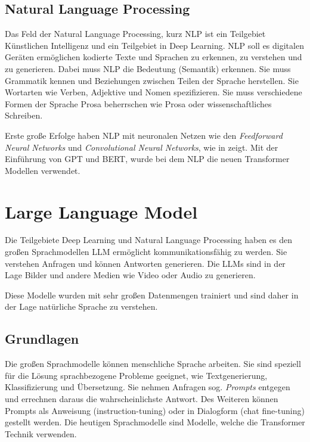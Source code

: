 \subsection{Natural Language Processing}
Das Feld der Natural Language Processing, kurz \acrshort{NLP} ist ein Teilgebiet Künstlichen Intelligenz und ein Teilgebiet in Deep Learning. NLP soll es digitalen Geräten ermöglichen kodierte Texte und Sprachen zu erkennen, zu verstehen und zu generieren. Dabei muss NLP die Bedeutung (Semantik) erkennen. Sie muss Grammatik kennen und Beziehungen zwischen Teilen der Sprache herstellen. Sie Wortarten wie Verben, Adjektive und Nomen spezifizieren. Sie muss verschiedene Formen der Sprache Prosa beherrschen wie Prosa oder wissenschaftliches Schreiben.\vspace{0.2cm}

Erste große Erfolge haben NLP mit neuronalen Netzen wie den \textit{Feedforward Neural Networks} und \textit{Convolutional Neural Networks}, wie in \cite{goldberg-2016} zeigt. Mit der Einführung von GPT und BERT, wurde bei dem NLP die neuen Transformer Modellen verwendet.

\section{Large Language Model}
Die Teilgebiete Deep Learning und Natural Language Processing haben es den großen Sprachmodellen \acrshort{LLM} ermöglicht kommunikationsfähig zu werden. Sie verstehen Anfragen und können Antworten generieren. Die LLMs sind in der Lage Bilder und andere Medien wie Video oder Audio zu generieren.\vspace{0.2cm}

Diese Modelle wurden mit sehr großen Datenmengen trainiert und sind daher in der Lage natürliche Sprache zu verstehen.

\subsection{Grundlagen}

Die großen Sprachmodelle können menschliche Sprache arbeiten. Sie sind speziell für die Lösung  sprachbezogene Probleme geeignet, wie Textgenerierung, Klassifizierung und Übersetzung. Sie nehmen Anfragen sog. \textit{Prompts} entgegen und errechnen daraus die wahrscheinlichste Antwort. Des Weiteren können Prompts als Anweisung (instruction-tuning) oder in Dialogform (chat fine-tuning) gestellt werden. Die heutigen Sprachmodelle sind Modelle, welche die Transformer Technik verwenden.

